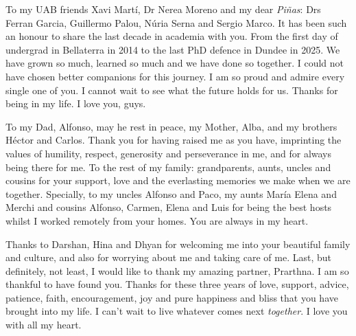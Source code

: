 To my UAB friends Xavi Martí, Dr Nerea Moreno and my dear \textit{Piñas}: Drs Ferran Garcia, Guillermo Palou, Núria Serna and Sergio Marco. It has been such an honour to share the last decade in academia with you. From the first day of undergrad in Bellaterra in 2014 to the last PhD defence in Dundee in 2025. We have grown so much, learned so much and we have done so together. I could not have chosen better companions for this journey. I am so proud and admire every single one of you. I cannot wait to see what the future holds for us. Thanks for being in my life. I love you, guys.

To my Dad, Alfonso, may he rest in peace, my Mother, Alba, and my brothers Héctor and Carlos. Thank you for having raised me as you have, imprinting the values of humility, respect, generosity and perseverance in me, and for always being there for me. To the rest of my family: grandparents, aunts, uncles and cousins for your support, love and the everlasting memories we make when we are together. Specially, to my uncles Alfonso and Paco, my aunts María Elena and Merchi and cousins Alfonso, Carmen, Elena and Luis for being the best hosts whilst I worked remotely from your homes. You are always in my heart.

Thanks to Darshan, Hina and Dhyan for welcoming me into your beautiful family and culture, and also for worrying about me and taking care of me. Last, but definitely, not least, I would like to thank my amazing partner, Prarthna. I am so thankful to have found you. Thanks for these three years of love, support, advice, patience, faith, encouragement, joy and pure happiness and bliss that you have brought into my life. I can't wait to live whatever comes next \textit{together}. I love you with all my heart.